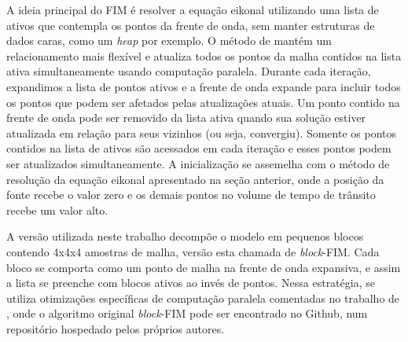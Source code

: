 A ideia principal do FIM é resolver a equação eikonal utilizando uma lista de ativos que contempla os pontos da frente de onda, sem manter estruturas de dados caras, como um \textit{heap} por exemplo. O método de  mantém um relacionamento mais flexível e atualiza todos os pontos da malha contidos na lista ativa simultaneamente usando computação paralela. Durante cada iteração, expandimos a lista de pontos ativos e a frente de onda expande para incluir todos os pontos que podem ser afetados pelas atualizações atuais.  Um ponto contido na frente de onda pode ser removido da lista ativa quando sua solução estiver atualizada em relação para seus vizinhos (ou seja, convergiu). Somente os pontos contidos na lista de ativos são acessados em cada iteração e esses pontos podem ser atualizados simultaneamente. A inicialização se assemelha com o método de resolução da equação eikonal apresentado na seção anterior, onde a posição da fonte recebe o valor zero e os demais pontos no volume de tempo de trânsito recebe um valor alto.

A versão utilizada neste trabalho decompõe o modelo em pequenos blocos contendo 4x4x4 amostras de malha, versão esta chamada de \textit{block}-FIM. Cada bloco se comporta como um ponto de malha na frente de onda expansiva, e assim a lista se preenche com blocos ativos ao invés de pontos. Nessa estratégia, se utiliza otimizações específicas de computação paralela comentadas no trabalho de , onde o algoritmo original \textit{block}-FIM pode ser encontrado no Github, num repositório hospedado pelos próprios autores.


